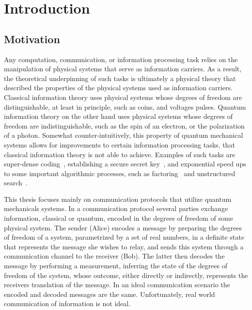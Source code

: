 \chapter{Introduction}


\section{Motivation}

Any computation, communication, or information processing task relies on the manipulation of physical systems that serve as information carriers.  As a result, the theoretical underpinning of such tasks is ultimately a physical theory that described the properties of the physical systems used as information carriers.  Classical information theory uses physical systems whose degrees of freedom are distinguishable, at least in principle, such as coins, and voltages pulses. Quantum information theory on the other hand uses physical systems whose degrees of freedom are indistinguishable, such as the spin of an electron, or the polarization of a photon.  Somewhat counter-intuitively, this property of quantum mechanical systems allows for improvements to certain information processing tasks, that classical information theory is not able to achieve.  Examples of such tasks are super-dense coding~\cite{BW92}, establishing a secure secret key~\cite{BB84}, and exponential speed ups to some important algorithmic processes, such as factoring~\cite{S99} and unstructured search~\cite{G96}. 

This thesis focuses mainly on communication protocols that utilize quantum mechanicals systems.  In a communication protocol several parties exchange information, classical or quantum, encoded in the degrees of freedom of some physical system. The sender (Alice) encodes a message by preparing the degrees of freedom of a system,  parametrized by a set of real numbers, in a definite state that represents the message she wishes to relay, and sends this system through a communication channel to the receiver (Bob).  The latter then decodes the message by performing a measurement, inferring the state of the degrees of freedom of the system, whose outcome, either directly or indirectly, represents the receivers translation of the message.  In an ideal communication scenario the encoded and decoded messages are the same.  Unfortunately, real world communication of information is not ideal. 

